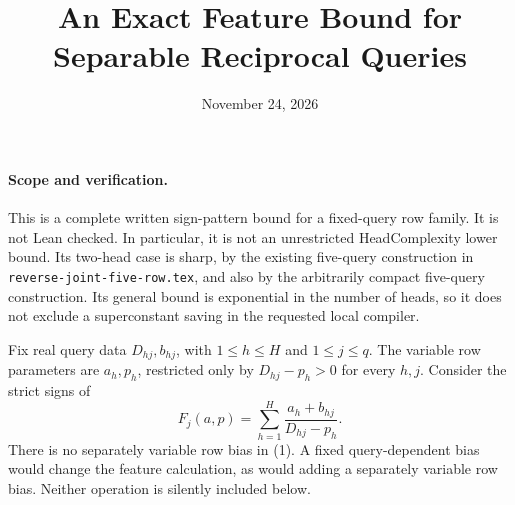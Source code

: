 \documentclass[11pt]{article}
\begin{document}
\title{An Exact Feature Bound for Separable Reciprocal Queries}
\author{}
\date{November 24, 2026}
\maketitle

\paragraph{Scope and verification.}
This is a complete written sign-pattern bound for a fixed-query row
family. It is not Lean checked. In particular, it is not an unrestricted
HeadComplexity lower bound. Its two-head case is sharp, by the existing
five-query construction in \texttt{reverse-joint-five-row.tex}, and also
by the arbitrarily compact five-query construction. Its general bound is
exponential in the number of heads, so it does not exclude a
superconstant saving in the requested local compiler.

Fix real query data $D_{hj},b_{hj}$, with $1\leq h\leq H$ and
$1\leq j\leq q$. The variable row parameters are $a_h,p_h$, restricted
only by $D_{hj}-p_h>0$ for every $h,j$. Consider the strict signs of
\[
 F_j(a,p)=\sum_{h=1}^H\frac{a_h+b_{hj}}{D_{hj}-p_h}.
 \tag{1}
\]
There is no separately variable row bias in (1). A fixed query-dependent
bias would change the feature calculation, as would adding a separately
variable row bias. Neither operation is silently included below.
\end{document}
